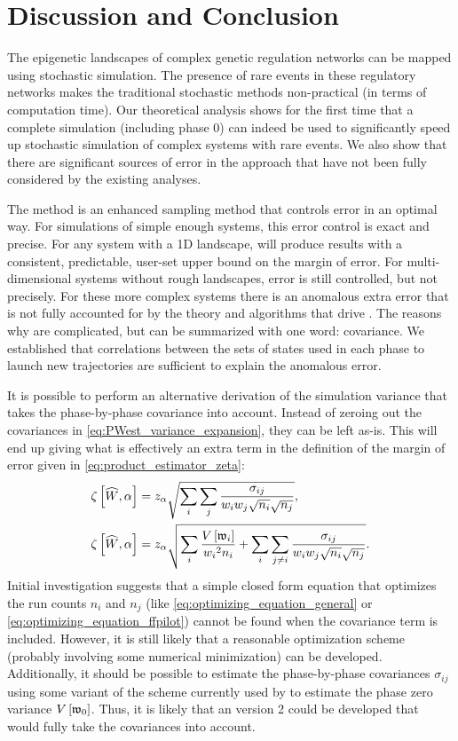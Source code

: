 \chapter{Discussion and Conclusion}
\label{chap:conclusion}

The epigenetic landscapes of complex genetic regulation networks can be mapped using stochastic simulation. The presence of rare events in these regulatory networks makes the traditional stochastic methods non-practical (in terms of computation time). Our theoretical analysis shows for the first time that a complete  simulation (including phase $0$) can indeed be used to significantly speed up stochastic simulation of complex systems with rare events. We also show that there are significant sources of error in the  approach that have not been fully considered by the existing analyses.

The  method is an enhanced sampling method that controls error in an optimal way. For simulations of simple enough systems, this error control is exact and precise. For any system with a 1D landscape,  will produce results with a consistent, predictable, user-set upper bound on the margin of error. For multi-dimensional systems without rough landscapes, error is still controlled, but not precisely. For these more complex systems there is an anomalous extra error that is not fully accounted for by the theory and algorithms that drive . The reasons why are complicated, but can be summarized with one word: covariance. We established that correlations between the sets of states used in each phase to launch new trajectories are sufficient to explain the anomalous error.

It is possible to perform an alternative derivation of the simulation variance that takes the phase-by-phase covariance into account. Instead of zeroing out the covariances in \eqref{eq:PWest_variance_expansion}, they can be left as-is. This will end up giving what is effectively an extra term in the definition of the margin of error given in \eqref{eq:product_estimator_zeta}:
\begin{align*}
    \zeta \left[ \widehat{W}, \alpha \right] &= z_{\alpha} \sqrt{\sum_i \sum_j \frac{\sigma_{ij}}{w_{i} w_{j} \sqrt{n_i} \sqrt{n_j}}}, \\
    \zeta \left[ \widehat{W}, \alpha \right] &= z_{\alpha} \sqrt{\sum_i \frac{V \left[ \mathfrak{w}_{i} \right]}{w_{i} {}^2 n_i} + \sum_i \sum_{j \neq i} \frac{\sigma_{ij}}{w_{i} w_{j} \sqrt{n_i} \sqrt{n_j}}}.
\end{align*}
Initial investigation suggests that a simple closed form equation that optimizes the run counts $n_i$ and $n_j$ (like \eqref{eq:optimizing_equation_general} or \eqref{eq:optimizing_equation_ffpilot}) cannot be found when the covariance term is included. However, it is still likely that a reasonable optimization scheme (probably involving some numerical minimization) can be developed. Additionally, it should be possible to estimate the phase-by-phase covariances $\sigma_{ij}$ using some variant of the scheme currently used by  to estimate the phase zero variance $V \left[ \mathfrak{w}_{0} \right]$. Thus, it is likely that an  version 2 could be developed that would fully take the covariances into account.

